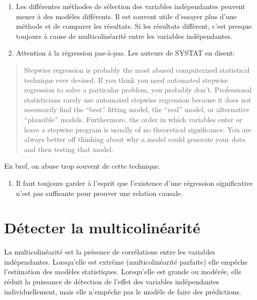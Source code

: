 \documentclass[
  12pt,
]{book}
\providecommand{\tightlist}{%
  \setlength{\itemsep}{0pt}\setlength{\parskip}{0pt}}
\begin{document}
\begin{enumerate}
\def\labelenumi{\arabic{enumi}.}
\tightlist
\item
  Les différentes méthodes de sélection des variables indépendantes peuvent mener à des modèles différents. Il est souvent utile d'essayer plus d'une méthode et de comparer les résultats. Si les résultats diffèrent, c'est presque toujours à cause de multicolinéarité entre les variables indépendantes.
\item
  Attention à la régression pas-à-pas. Les auteurs de SYSTAT en disent:
\end{enumerate}

\begin{quote}
Stepwise regression is probably the most abused computerized statistical technique ever devised. If you think you need automated stepwise regression to solve a particular problem, you probably don't. Professional statisticians rarely use automated stepwise regression because it does not necessarily find the ``best'' fitting model, the ``real'' model, or alternative ``plausible'' models. Furthermore, the order in which variables enter or leave a stepwise program is usually of no theoretical significance. You are always better off thinking about why a model could generate your data and then testing that model.
\end{quote}

En bref, on abuse trop souvent de cette technique.

\begin{enumerate}
\def\labelenumi{\arabic{enumi}.}
\setcounter{enumi}{2}
\tightlist
\item
  Il faut toujours garder à l'esprit que l'existence d'une régression significative n'est pas suffisante pour prouver une relation causale.
\end{enumerate}

\hypertarget{duxe9tecter-la-multicolinuxe9arituxe9}{%
\section{Détecter la multicolinéarité}\label{duxe9tecter-la-multicolinuxe9arituxe9}}

La multicolinéarité est la présence de corrélations entre les variables indépendantes. Lorsqu'elle est extrême (multicolinéarité parfaite) elle empêche l'estimation des modèles statistiques. Lorsqu'elle est grande ou modérée, elle réduit la puissance de détection de l'effet des variables indépendantes individuellement, mais elle n'empêche pas le modèle de faire des prédictions.
\end{document}
